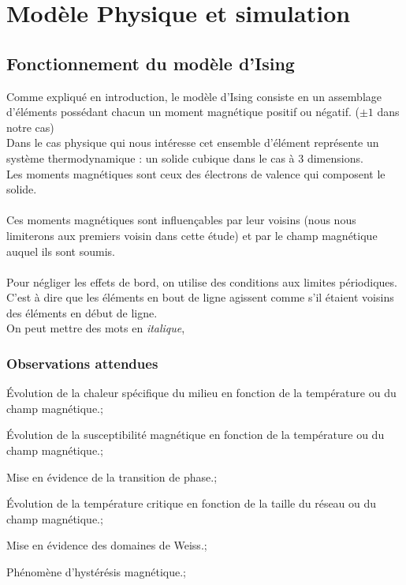 \section{Modèle Physique et simulation}


\subsection{Fonctionnement du modèle d'Ising}

Comme expliqué en introduction, le modèle d'Ising consiste en un assemblage d'éléments possédant chacun un moment magnétique positif ou négatif. ($\pm 1$ dans notre cas)\\

Dans le cas physique qui nous intéresse cet ensemble d'élément représente un système thermodynamique : un solide cubique dans le cas à 3 dimensions.\\
Les moments magnétiques sont ceux des électrons de valence qui composent le solide.\\
\\
Ces moments magnétiques sont influençables par leur voisins (nous nous limiterons aux premiers voisin dans cette étude) et par le champ magnétique auquel ils sont soumis.\\
\\
Pour négliger les effets de bord, on utilise des conditions aux limites périodiques. C'est à dire que les éléments en bout de ligne agissent comme s'il étaient voisins des éléments en début de ligne.\\





On peut mettre des mots en \emph{italique}, 

\subsubsection{Observations attendues}
\item Évolution de la chaleur spécifique du milieu en fonction de la température ou du champ magnétique.;
\item Évolution de la susceptibilité magnétique en fonction de la température ou du champ magnétique.;
\item Mise en évidence de la transition de phase.;
\item Évolution de la température critique en fonction de la taille du réseau ou du champ magnétique.;
\item Mise en évidence des domaines de Weiss.;
\item Phénomène d'hystérésis magnétique.;


